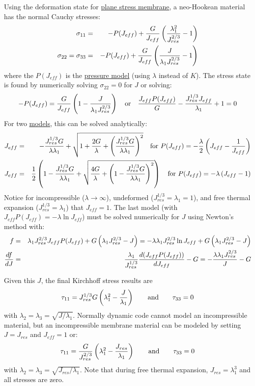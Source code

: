 \documentclass[11pt]{book}
\def\Jeff{J_{eff}}
\def\Jres{J_{res}}
\begin{document}
Using the deformation state for \hyperref[MMT]{plane stress membrane}, a neo-Hookean material has the normal Cauchy stresses:
\begin{eqnarray}
      \sigma_{11} & = & -P(\Jeff) + {G\over\Jeff}\left({\lambda_1^2\over\Jres^{2/3}}-1\right) \\
      \sigma_{22} = \sigma_{33} & = & -P(\Jeff) + {G\over\Jeff}\left({J\over\lambda_1\Jres^{2/3}}-1\right)\end{eqnarray}
where the $P(\Jeff)$ is the \hyperref[PTerms]{pressure model} (using $\lambda$ instead of $K$). The stress state is found by numerically solving $\sigma_{22}=0$ for $J$ or solving:
\begin{equation}
	-P(\Jeff) =  {G\over\Jeff}\left(1-{J\over\lambda_1\Jres^{2/3}}\right)
	\quad{\rm or}\quad {\Jeff P(\Jeff)\over  G} - {\Jres^{1/3}\Jeff\over\lambda_1} +1 = 0
\end{equation}
For two \hyperref[PTerms]{models}, this can be solved analytically:
\begin{eqnarray}
   \Jeff & = & -{\Jres^{1/3}G\over \lambda\lambda_1} + \sqrt{1 +  {2G\over\lambda} + \left({\Jres^{1/3}G\over \lambda\lambda_1}\right)^2 } 
                                    \quad{\rm for}\ P(\Jeff) = -{\lambda\over2}\left(\Jeff - {1\over\Jeff}\right) \\
   \Jeff & = & {1\over2}\left(1 - {\Jres^{1/3}G\over \lambda\lambda_1} + \sqrt{{4G\over \lambda} + \left(1 - {\Jres^{1/3}G\over \lambda\lambda_1}\right)^2} \right)
                                    \quad{\rm for}\ P(\Jeff) = -\lambda\left(\Jeff - 1\right) 
\end{eqnarray}
Notice for incompressible ($\lambda\to\infty$), undeformed ($\Jres^{1/3}=\lambda_1=1$), and free thermal expansion ($\Jres^{1/3}=\lambda_1$) that $\Jeff = 1$.
The last model (with $\Jeff P(\Jeff) = -\lambda \ln \Jeff$) must be solved numerically for $J$ using Newton's method with:
\begin{eqnarray}
	f & = & \lambda_1\Jres^{2/3}\Jeff P(\Jeff) +  G\left(\lambda_1\Jres^{2/3}-J\right) = -\lambda\lambda_1\Jres^{2/3}\ln \Jeff +  G\left(\lambda_1\Jres^{2/3}-J\right) \\
	{df\over dJ} & = &{ \lambda_1\over \Jres^{1/3}}{d(\Jeff P(\Jeff))\over d\Jeff} - G = -{ \lambda\lambda_1\Jres^{2/3}\over J} - G
\end{eqnarray}

Given this $J$, the final Kirchhoff stress results are
\begin{equation}
     \tau_{11} =  \Jres^{1/3}G\left(\lambda_1^2 - {J\over\lambda_1}\right) \qquad{\rm and}\qquad
     \tau_{33} = 0 
\end{equation}
with $\lambda_2 = \lambda_3 = \sqrt{J/\lambda_1}$.
Normally dynamic code cannot model an incompressible material, but an incompressible membrane material can be modeled by setting $J=\Jres$ and $\Jeff = 1$ or:
\begin{equation}
     \tau_{11} =  {G\over \Jres^{2/3}}\left(\lambda_1^2 - {\Jres\over\lambda_1}\right) \qquad{\rm and}\qquad
     \tau_{33} = 0 
\end{equation}
with $\lambda_2 = \lambda_3 = \sqrt{\Jres/\lambda_1}$.
Note that during free thermal expansion, $\Jres=\lambda_1^3$ and all stresses are zero.
\end{document}
